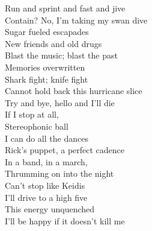 Run and sprint and fast and jive \\
Contain? No, I'm taking my swan dive \\
Sugar fueled escapades \\
New friends and old drugs \\
Blast the music; blast the past \\
Memories overwritten \\
Shark fight; knife fight \\
Cannot hold back this hurricane slice \\
Try and bye, hello and I'll die \\
If I stop at all, \\
Stereophonic ball \\
I can do all the dances \\
Rick's puppet, a perfect cadence \\
In a band, in a march, \\
Thrumming on into the night \\
Can't stop like Keidis \\
I'll drive to a high five \\
This energy unquenched \\
I'll be happy if it doesn't kill me \\

